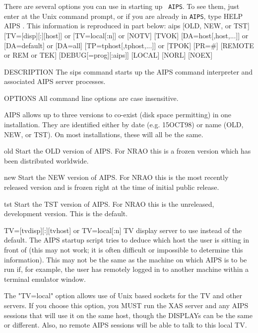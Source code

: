      There are several options you can use in starting up {\tt
AIPS}\@.  To see them, just enter {\tt {}} at the Unix
command prompt, or if you are already in {\tt AIPS}, type {\us HELP
AIPS \CR}\@.  This information is reproduced in part below:
\bve
       aips [OLD, NEW, or TST]
            [TV=[disp][:][host]]
         or [TV=local[:n]]
         or [NOTV]
            [TVOK]
            [DA=host[,host,...]]
         or [DA=default]
         or [DA=all]
            [TP=tphost[,tphost,...]]
         or [TPOK]
            [PR=#]
            [REMOTE or REM or TEK]
            [DEBUG[=prog][:aips]]
            [LOCAL] [NORL] [NOEX]

DESCRIPTION
       The  sips  command  starts up the AIPS command interpreter and associated AIPS
       server processes.

OPTIONS
       All command line options are case insensitive.

       AIPS allows up to three versions to co-exist (disk space  permitting)  in  one
       installation.  They are identified either by date (e.g. 15OCT98) or name (OLD,
       NEW, or TST).  On most installations, these will all be the same.

       old     Start the OLD version of AIPS.  For NRAO  this  is  a  frozen  version
               which has been distributed worldwide.

       new     Start  the  NEW  version  of AIPS.  For NRAO this is the most recently
               released version and is frozen right at the  time  of  initial  public
               release.

       tst     Start  the  TST  version  of  AIPS.   For NRAO this is the unreleased,
               development version.  This is the default.

       TV=[tvdisp][:][tvhost] or TV=local[:n]
               TV display server to use instead of the  default.   The  AIPS  startup
               script  tries  to  deduce  which  host the user is sitting in front of
               (this may not work; it is often difficult or impossible  to  determine
               this  information).   This may not be the same as the machine on which
               AIPS is to be run if, for example, the user has remotely logged in  to
               another machine within a terminal emulator window.

               The  "TV=local" option allows use of Unix based sockets for the TV and
               other servers.  If you choose this option, you MUST run the XAS server
               and  any  AIPS  sessions that will use it on the same host, though the
               DISPLAYs can be the same or different.  Also, no remote AIPS  sessions
               will be able to talk to this local TV.

